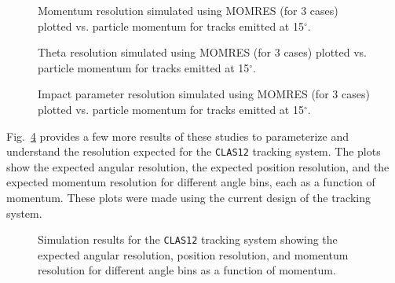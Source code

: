 \begin{figure}[htpb]
\vspace{9.0cm}
\caption{\small{Momentum resolution simulated using MOMRES (for 3 cases)
plotted vs. particle momentum for tracks emitted at 15$^\circ$.}}
\label{comparep}
\end{figure}

\begin{figure}[htpb]
\vspace{9.0cm}
\caption{\small{Theta resolution simulated using MOMRES (for 3 cases)
plotted vs. particle momentum for tracks emitted at 15$^\circ$. }}
\label{compareth}
\end{figure}

\begin{figure}[htpb]
\vspace{9.0cm}
\caption{\small{Impact parameter resolution simulated using MOMRES (for 3 cases)
plotted vs. particle momentum for tracks emitted at 15$^\circ$.}}
\label{comparex}
\end{figure}

Fig.~\ref{resol} provides a few more results of these studies to
parameterize and understand the resolution expected for the {\tt CLAS12}
tracking system.  The plots show the expected angular resolution, the 
expected position resolution, and the expected momentum resolution
for different angle bins, each as a function of momentum.  These plots
were made using the current design of the tracking system.

\begin{figure}[htbp]
\vspace{12.0cm}
\caption{\small{Simulation results for the {\tt CLAS12} tracking system
showing the expected angular resolution, position resolution, and
momentum resolution for different angle bins as a function of momentum.}
\label{resol}}
\end{figure}


